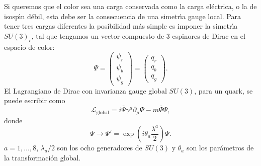 Si queremos que el color sea una carga conservada como la carga el\'ectrica, o la de isosp\'\i n d\'ebil, esta debe ser la consecuencia de una simetr\'\i a gauge local. Para tener tres cargas diferentes la posibilidad m\'as simple es imponer la simetr\'\i a $SU(3)_c$, tal que tengamos un vector compuesto de 3 espinores de Dirac en el espacio de color:
\begin{equation}
  \Psi=
  \begin{pmatrix}
    \psi_r\\
    \psi_b\\
    \psi_g
  \end{pmatrix}
  =
  \begin{pmatrix}
    q_r\\
    q_b\\
    q_g
  \end{pmatrix}.
\end{equation}
El Lagrangiano de Dirac con invarianza gauge global $SU(3)$, para un quark, se puede escribir como
\begin{equation}
  \label{eq:128}
  \mathcal{L}_{\text{global}}=i\bar{\Psi}\gamma^\mu\partial_\mu\Psi-m\bar{\Psi}\Psi,
\end{equation}
donde
\begin{equation}
  \Psi\to \Psi'=\exp\left(i\theta_a\frac{\lambda^a}{2}\right)\Psi.
\end{equation}
$a=1,\ldots,8$, $\lambda_a/2$ son los ocho generadores de $SU(3)$ y $\theta_a$ son los par\'ametros de la transformaci\'on global. 

